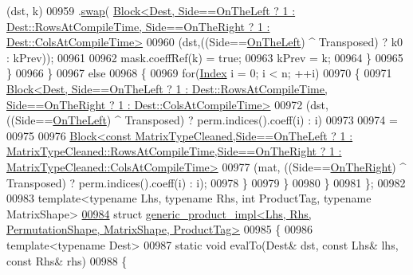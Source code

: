 \begin{DoxyCode}
      (dst, k)
00959             .\hyperlink{endian_8c_a3ca5ecd34b04d6a243c054ac3a57f68d}{swap}(
      \hyperlink{group___core___module_class_eigen_1_1_block}{Block<Dest, Side==OnTheLeft ? 1 : Dest::RowsAtCompileTime, Side==OnTheRight ? 1 : Dest::ColsAtCompileTime>}
00960                        (dst,((Side==\hyperlink{group__enums_ggac22de43beeac7a78b384f99bed5cee0ba129609b3bdf23b071f5f86cf2f995ec4}{OnTheLeft}) ^ Transposed) ? k0 : kPrev));
00961 
00962             mask.coeffRef(k) = \textcolor{keyword}{true};
00963             kPrev = k;
00964           \}
00965         \}
00966       \}
00967       \textcolor{keywordflow}{else}
00968       \{
00969         \textcolor{keywordflow}{for}(\hyperlink{namespace_eigen_a62e77e0933482dafde8fe197d9a2cfde}{Index} i = 0; i < n; ++i)
00970         \{
00971           
      \hyperlink{group___core___module_class_eigen_1_1_block}{Block<Dest, Side==OnTheLeft ? 1 : Dest::RowsAtCompileTime, Side==OnTheRight ? 1 : Dest::ColsAtCompileTime>}
00972                (dst, ((Side==\hyperlink{group__enums_ggac22de43beeac7a78b384f99bed5cee0ba129609b3bdf23b071f5f86cf2f995ec4}{OnTheLeft}) ^ Transposed) ? perm.indices().coeff(i) : i)
00973 
00974           =
00975 
00976           
      \hyperlink{group___core___module_class_eigen_1_1_block}{Block<const MatrixTypeCleaned,Side==OnTheLeft ? 1 : MatrixTypeCleaned::RowsAtCompileTime,Side==OnTheRight ?
       1 : MatrixTypeCleaned::ColsAtCompileTime>}
00977                (mat, ((Side==\hyperlink{group__enums_ggac22de43beeac7a78b384f99bed5cee0ba99dc75d8e00b6c3a5bdc31940f47492b}{OnTheRight}) ^ Transposed) ? perm.indices().coeff(i) : i);
00978         \}
00979       \}
00980     \}
00981 \};
00982 
00983 \textcolor{keyword}{template}<\textcolor{keyword}{typename} Lhs, \textcolor{keyword}{typename} Rhs, \textcolor{keywordtype}{int} ProductTag, \textcolor{keyword}{typename} MatrixShape>
\hyperlink{struct_eigen_1_1internal_1_1generic__product__impl_3_01_lhs_00_01_rhs_00_01_permutation_shape_00d89930186aaeed972c89117934065103}{00984} \textcolor{keyword}{struct }\hyperlink{struct_eigen_1_1internal_1_1generic__product__impl_3_01_lhs_00_01_rhs_00_01_permutation_shape_00d89930186aaeed972c89117934065103}{generic\_product\_impl<Lhs, Rhs, PermutationShape, MatrixShape, ProductTag>}
00985 \{
00986   \textcolor{keyword}{template}<\textcolor{keyword}{typename} Dest>
00987   \textcolor{keyword}{static} \textcolor{keywordtype}{void} evalTo(Dest& dst, \textcolor{keyword}{const} Lhs& lhs, \textcolor{keyword}{const} Rhs& rhs)
00988   \{

\end{DoxyCode}
